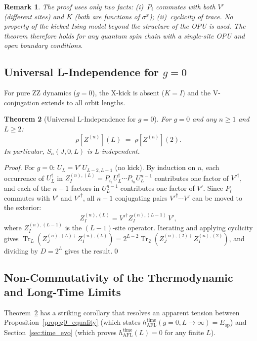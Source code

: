 \documentclass[12pt,a4paper]{article}
\newtheorem{theorem}{Theorem}[section]
\newtheorem{remark}[theorem]{Remark}
\begin{document}
\begin{remark}
The proof uses only two facts: (i)~$P_i$ commutes with both $V'$ (different sites)
and $K$ (both are functions of $\sigma^x$); (ii)~cyclicity of trace.
No property of the kicked Ising model beyond the structure of the OPU is used.
The theorem therefore holds for any quantum spin chain with a single-site OPU and
open boundary conditions.
\end{remark}

\subsection{Universal L-Independence for $g=0$}

For pure ZZ dynamics ($g=0$), the X-kick is absent ($K=I$) and the V-conjugation
extends to all orbit lengths.

\begin{theorem}[Universal L-Independence for $g=0$]\label{thm:L_indep_g0}
For $g=0$ and any $n\ge 1$ and $L\ge 2$:
\begin{equation}
  \rho[Z^{(n)}](L) \;=\; \rho[Z^{(n)}](2).
\end{equation}
In particular, $S_n(J,0,L)$ is $L$-independent.
\end{theorem}

\begin{proof}
For $g=0$: $U_L = V'\,U_{L-2,L-1}$ (no kick).  By induction on $n$, each
occurrence of $U_L^\dagger$ in $Z^{(n),(L)}_I = P_{i_1}U_L^\dagger\cdots P_{i_n}U_L^{n-1}$
contributes one factor of ${V'}^\dagger$, and each of the $n-1$ factors in $U_L^{n-1}$
contributes one factor of $V'$.  Since $P_i$ commutes with $V'$ and ${V'}^\dagger$,
all $n-1$ conjugating pairs ${V'}^\dagger\!\cdots V'$ can be moved to the exterior:
\[
  Z^{(n),(L)}_I = {V'}^\dagger Z^{(n),(L-1)}_I\,V',
\]
where $Z^{(n),(L-1)}_I$ is the $(L-1)$-site operator. Iterating and applying
cyclicity gives
$\operatorname{Tr}_{L}(Z^{(n),(L)\dagger}_J Z^{(n),(L)}_I)
= 2^{L-2}\operatorname{Tr}_2(Z^{(n),(2)\dagger}_J Z^{(n),(2)}_I)$,
and dividing by $D=2^L$ gives the result.\qed
\end{proof}

\subsection{Non-Commutativity of the Thermodynamic and Long-Time Limits}

Theorem~\ref{thm:L_indep_g0} has a striking corollary that resolves an apparent
tension between Proposition~\ref{prop:g0_equality} (which states
$h_\mathrm{AFL}^\mathrm{time}(g=0,L\to\infty) = E_\mathrm{op}$) and
Section~\ref{sec:time_evo} (which proves $h_\mathrm{AFL}^\mathrm{time}(L) = 0$ for
any finite $L$).
\end{document}
